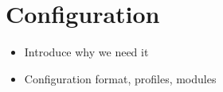 \section{Configuration}

\begin{itemize}
\item Introduce why we need it
\item Configuration format, profiles, modules
\end{itemize}
